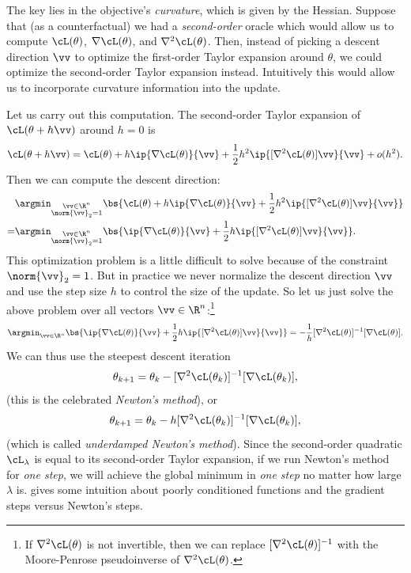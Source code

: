 \documentclass[../../book-main.tex]{subfiles}
\begin{document}
The key lies in the objective's \textit{curvature}, which is given by
the Hessian. Suppose that (as a counterfactual) we had a
\textit{second-order} oracle which would allow us to compute
\(\cL(\theta)\), \(\nabla \cL(\theta)\), and
\(\nabla^{2}\cL(\theta)\). Then, instead of picking a descent
direction \(\vv\) to optimize the first-order Taylor expansion around
\(\theta\), we could optimize the second-order Taylor expansion
instead. Intuitively this would allow us to incorporate curvature
information into the update.

Let us carry out this computation. The second-order Taylor expansion
of \(\cL(\theta + h\vv)\) around \(h = 0\) is
\begin{equation}
    \cL(\theta + h\vv) = \cL(\theta) + h\ip{\nabla \cL(\theta)}{\vv}
    + \frac{1}{2}h^{2}\ip{[\nabla^{2}\cL(\theta)]\vv}{\vv} + o(h^{2}).
\end{equation}
Then we can compute the descent direction:
\begin{align}
    & \argmin_{\substack{\vv \in \R^{n} \\ \norm{\vv}_{2} =
    1}}\bs{\cL(\theta) + h\ip{\nabla \cL(\theta)}{\vv} +
    \frac{1}{2}h^{2}\ip{[\nabla^{2}\cL(\theta)]\vv}{\vv}} \\
    = &\argmin_{\substack{\vv \in \R^{n} \\ \norm{\vv}_{2} =
    1}}\bs{\ip{\nabla \cL(\theta)}{\vv} +
    \frac{1}{2}h\ip{[\nabla^{2}\cL(\theta)]\vv}{\vv}}.
\end{align}
This optimization problem is a little difficult to solve because of
the constraint \(\norm{\vv}_{2} = 1\). But in practice we never
normalize the descent direction \(\vv\) and use the step size \(h\)
to control the size of the update. So let us just solve the above
problem over all vectors \(\vv \in \R^{n}\):\footnote{If
    \(\nabla^{2}\cL(\theta)\) is not invertible, then we can replace
    \([\nabla^{2}\cL(\theta)]^{-1}\) with the Moore-Penrose pseudoinverse
of \(\nabla^{2}\cL(\theta)\).}
\begin{equation}
    \argmin_{\vv \in \R^{n}}\bs{\ip{\nabla \cL(\theta)}{\vv} +
    \frac{1}{2}h\ip{[\nabla^{2}\cL(\theta)]\vv}{\vv}} =
    -\frac{1}{h}[\nabla^{2}\cL(\theta)]^{-1}[\nabla \cL(\theta)].
\end{equation}
We can thus use the steepest descent iteration
\begin{equation}
    \theta_{k + 1} = \theta_{k} -
    [\nabla^{2}\cL(\theta_{k})]^{-1}[\nabla \cL(\theta_{k})],
\end{equation}
(this is the celebrated \textit{Newton's method}), or
\begin{equation}
    \theta_{k + 1} = \theta_{k} -
    h[\nabla^{2}\cL(\theta_{k})]^{-1}[\nabla \cL(\theta_{k})],
\end{equation}
(which is called \textit{underdamped Newton's method}). Since the
second-order quadratic \(\cL_{\lambda}\) is equal to its second-order
Taylor expansion, if we run Newton's method for \textit{one step}, we
will achieve the global minimum in \textit{one step} no matter how
large \(\lambda\) is.  gives some
intuition about poorly conditioned functions and the gradient steps
versus Newton's steps.
\end{document}
